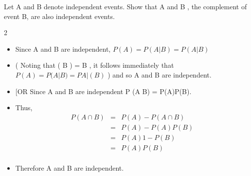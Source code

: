 \documentclass[a4paper,12pt]{article}
\begin{document}
\large

\noindent Let A and B denote independent events.
Show that A and B , the complement of event B, are also independent events.



2
\begin{itemize}
\item Since A and B are independent, $P ( A ) = P ( A | B ) = P ( A | B )$
\item (
Noting that ( B ) = B , it follows immediately that $P ( A ) = P ( A | B ) = P A | ( B )$
)
and so A and B are independent.
\item [OR
Since A and B are independent P (A \cap B) = P(A)P(B).
\item Thus,
\begin{eqnarray*}
P(A \cap B ) &=& P(A) − P(A \cap B) \\ 
&=& P(A) − P(A)P(B) \\ &=& P(A){1 − P(B)} \\ &=& P(A)P( B )
\\
\end{eqnarray*}

\item Therefore A and B are independent.
\end{itemize}
\end{document}
